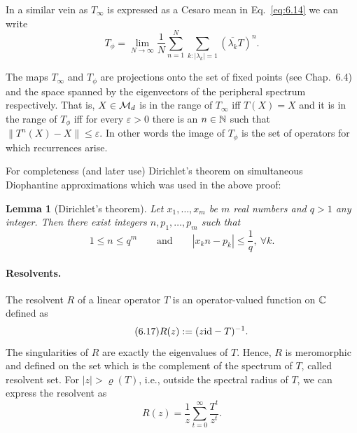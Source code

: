 \documentclass[11pt,a4paper]{article}
\theoremstyle{plain}
\newtheorem{lemma}{Lemma}[section]
\theoremstyle{definition}
\theoremstyle{remark}
\begin{document}
In a similar vein as $T_\infty$ is expressed as a Cesaro mean in Eq.~\eqref{eq:6.14}
we can write
\begin{equation}\tag{6.15}\label{eq:6.15}
    T_\phi
    = \lim_{N\to\infty}\frac{1}{N}\sum_{n=1}^N
    \sum_{k:|\lambda_k|=1} (\overline{\lambda_k}T)^n.
\end{equation}

The maps $T_\infty$ and $T_\phi$ are projections onto the set of fixed points
(see Chap.~6.4) and the space spanned by the eigenvectors of the peripheral
spectrum respectively. That is, $X\in\mathcal{M}_d$ is in the range of $T_\infty$ iff
$T(X)=X$ and it is in the range of $T_\phi$ iff for every $\varepsilon>0$ there
is an $n\in\mathbb{N}$ such that $\|T^n(X)-X\|\le \varepsilon$. In other words the image
of $T_\phi$ is the set of operators for which recurrences arise.

For completeness (and later use) Dirichlet's theorem on simultaneous Diophantine
approximations which was used in the above proof:

\begin{lemma}[Dirichlet's theorem]
    Let $x_1,\dots,x_m$ be $m$ real numbers and $q>1$ any integer. Then there exist
    integers $n,p_1,\dots,p_m$ such that
    \begin{equation}\tag{6.16}\label{eq:6.16}
        1\le n\le q^m
        \qquad\text{and}\qquad
        |x_k n - p_k|\le \frac{1}{q},
        \ \forall k.
    \end{equation}
\end{lemma}

\paragraph{Resolvents.}
The resolvent $R$ of a linear operator $T$ is an operator-valued function on
$\mathbb{C}$ defined as
\begin{equation}\tag{6.17}\label{eq:6.17}
    R(z):=(z\mathrm{id} - T)^{-1}.
\end{equation}
The singularities of $R$ are exactly the eigenvalues of $T$. Hence, $R$ is
meromorphic and defined on the set which is the complement of the spectrum of
$T$, called resolvent set. For $|z|>\varrho(T)$, i.e., outside the spectral radius
of $T$, we can express the resolvent as
\begin{equation}\tag{6.18}\label{eq:6.18}
    R(z)=\frac{1}{z}\sum_{t=0}^\infty \frac{T^t}{z^t}.
\end{equation}
\end{document}
